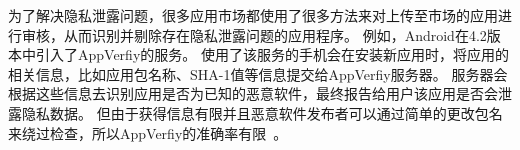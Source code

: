 \begin{figure}
	\centering
	\hspace{1in}
\end{figure}

为了解决隐私泄露问题，很多应用市场都使用了很多方法来对上传至市场的应用进行审核，从而识别并剔除存在隐私泄露问题的应用程序。
例如，Android在4.2版本中引入了AppVerfiy的服务。
使用了该服务的手机会在安装新应用时，将应用的相关信息，比如应用包名称、SHA-1值等信息提交给AppVerfiy服务器。
服务器会根据这些信息去识别应用是否为已知的恶意软件，最终报告给用户该应用是否会泄露隐私数据。
但由于获得信息有限并且恶意软件发布者可以通过简单的更改包名来绕过检查，所以AppVerfiy的准确率有限~\supercite{appverify}。

